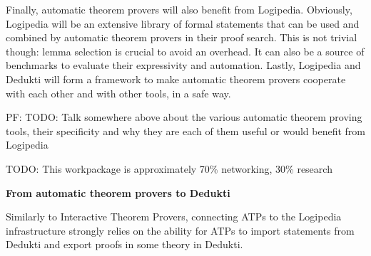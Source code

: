 Finally, automatic theorem provers will also benefit from
Logipedia. Obviously, Logipedia will be an extensive library of formal
statements that can be used and combined by automatic theorem provers
in their proof search. This is not trivial though: lemma selection is
crucial to avoid an overhead. It can also be a source of benchmarks to
evaluate their expressivity and automation.  Lastly, Logipedia and
Dedukti will form a framework to make automatic theorem provers
cooperate with each other and with other tools, in a safe way.

PF: TODO: Talk somewhere above about the various automatic theorem
proving tools, their specificity and why they are each of them useful
or would benefit from Logipedia

TODO: This workpackage is approximately 70\% networking, 30\% research

\medskip

\noindent
{\bf \large From automatic theorem provers to Dedukti}

Similarly to Interactive Theorem Provers, connecting ATPs to the Logipedia
infrastructure strongly relies on the ability for ATPs to import statements from
Dedukti and export proofs in some theory in Dedukti.

